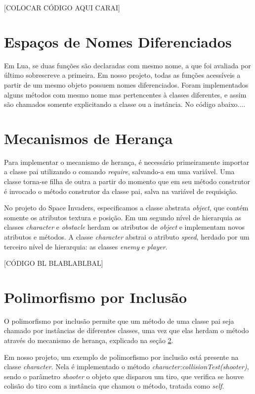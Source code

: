 \documentclass[rel_mlp]{iiufrgs}
\begin{document}
[COLOCAR CÓDIGO AQUI CARAI]


\section{Espaços de Nomes Diferenciados} \label{Espaço}

Em Lua, se duas funções são declaradas com mesmo nome, a que foi avaliada por último sobrescreve a primeira. Em nosso projeto, todas as funções acessíveis a partir de um mesmo objeto possuem nomes diferenciados. Foram implementados alguns métodos com mesmo nome mas pertencentes à classes diferentes, e assim são chamados somente explicitando a classe ou a instância. No código abaixo....



\section{Mecanismos de Herança} \label{Herança}

Para implementar o mecanismo de herança, é necessário primeiramente importar a classe pai utilizando o comando \textit{require}, salvando-a em uma variável. Uma classe torna-se filha de outra a partir do momento que em seu método construtor é invocado o método construtor da classe pai, salva na variável de requisição. 

No projeto do Space Invaders, especificamos a classe abstrata \textit{object}, que contém somente os atributos textura e posição. Em um segundo nível de hierarquia as classes \textit{character} e \textit{obstacle} herdam os atributos de \textit{object} e implementam novos atributos e métodos. A classe \textit{character} abstrai o atributo \textit{speed}, herdado por um terceiro nível de hierarquia: as classes \textit{enemy} e \textit{player}.

[CÓDIGO BL BLABLABLBAL]


\section{Polimorfismo por Inclusão}

O polimorfismo por inclusão permite que um método de uma classe pai seja chamado por instâncias de diferentes classes, uma vez que elas herdam o método através do mecanismo de herança, explicado na seção \ref{Herança}. 

Em nosso projeto, um exemplo de polimorfismo por inclusão está presente na classe \textit{character}. Nela é implementado o método \textit{character:collisionTest(shooter)}, sendo o parâmetro \textit{shooter} o objeto que disparou um tiro, que verifica se houve colisão do tiro com a instância que chamou o método, tratada como \textit{self}.
\end{document}
